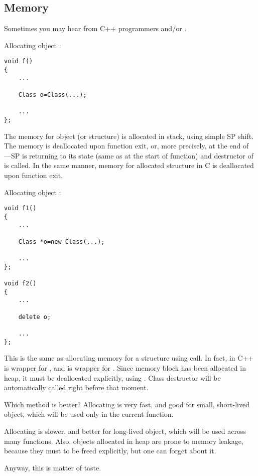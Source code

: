 \subsection{Memory}

Sometimes you may hear from C++ programmers  and/or .

Allocating object :

\begin{lstlisting}[style=customc]
void f()
{
	...

	Class o=Class(...);

	...
};
\end{lstlisting}

The memory for object (or structure) is allocated in stack, using simple \ac{SP} shift.
The memory is deallocated upon function exit, or, more precisely, at the end of ---\ac{SP} is returning to its state (same as at the start of function) and destructor of  is called.
In the same manner, memory for allocated structure in C is deallocated upon function exit.

Allocating object :

\begin{lstlisting}[style=customc]
void f1()
{
	...

	Class *o=new Class(...);

	...
};

void f2()
{
	...

	delete o;

	...
};
\end{lstlisting}

This is the same as allocating memory for a structure using  call.
In fact,  in C++ is wrapper for , and  is wrapper for .
Since memory block has been allocated in \gls{heap}, it must be deallocated explicitly, using .
Class destructor will be automatically called right before that moment.

Which method is better?
Allocating  is very fast, and good for small, short-lived object, which will be used only in the current function.

Allocating  is slower, and better for long-lived object, which will be used across many functions.
Also, objects allocated in \gls{heap} are prone to memory leakage, because they must to be freed explicitly, but one can
forget about it.

Anyway, this is matter of taste.
